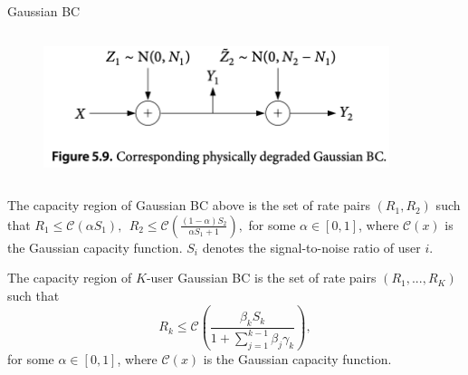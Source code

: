 \documentclass[aspectratio=43, 10pt]{beamer}
\begin{document}
\begin{frame}{Gaussian BC}
\begin{columns}
            \begin{column}{0.5\textwidth}
                \begin{figure}
                \centering
                    \includegraphics[width=0.9\textwidth]{figures/GBC2.png}
                \end{figure}
            \end{column}
        \end{columns}

        \small 
        \begin{theorem}[Capacity region of 2Rx Gaussian BC $=$ SC-SIC ]
            The capacity region of Gaussian BC above is the set of rate pairs $(R_1,R_2)$ such that 
            $R_1 \leq \mathcal{C}(\alpha S_1), ~~R_2\leq \mathcal{C}(\frac{(1-\alpha)S_2}{\alpha S_1 + 1}),$ for some $\alpha \in [0,1]$, where $\mathcal{C}(x)$ is the Gaussian capacity function. $S_i$ denotes the signal-to-noise ratio of user $i.$
        \end{theorem}

        \vspace{-0.8em}
        \begin{theorem}[Capacity region of $K\geq2$-users Gaussian BC $=$ SC-SIC]
            The capacity region of $K$-user Gaussian BC is the set of rate pairs $(R_1,...,R_K)$ such that 
            $$R_k \leq \mathcal{C}(\frac{\beta_k S_k}{1+\sum_{j=1}^{k-1}\beta_j \gamma_k}),$$ for some $\alpha \in [0,1]$, where $\mathcal{C}(x)$ is the Gaussian capacity function.
        \end{theorem}

        
    \end{frame}
\end{document}
